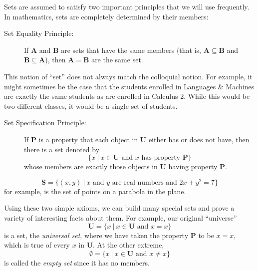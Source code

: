 \documentclass{article}
\newcommand\A{\mathbf A}
\newcommand\B{\mathbf B}
\newcommand\Pb{\mathbf P}
\newcommand\Sb{\mathbf S}
\newcommand\U{\mathbf U}
\newcommand{\0}{\mathbf 0}
\newcommand{\1}{\mathbf 1}
\begin{document}
Sets are assumed to satisfy two important principles that we will use frequently. In mathematics, sets are completely determined by their members:

\begin{description}
  \item[Set Equality Principle:] If $\A$ and $\B$ are sets that have the same members (that is, $\A \subseteq \B$ and $\B \subseteq \A$), then $\A = \B$ are the same set.
\end{description}

This notion of ``set'' does not always match the colloquial notion. For example, it might sometimes be the case that the students enrolled in Languages \& Machines are exactly the same students as are enrolled in Calculus 2. While this would be two different classes, it would be a single set of students.

\begin{description}
  \item[Set Specification Principle:] If $\Pb$ is a property that each object in $\U$ either has or does not have, then there is a set denoted by
    \begin{equation*}
    \{ x\ |\ x \in \U \text{ and } x \text{ has property } \Pb \}
    \end{equation*}
    whose members are exactly those objects in $\U$ having property $\Pb$.
\end{description}

\begin{equation*}
\Sb = \{ (x,y)\ |\ x \text{ and } y \text{ are real numbers and } 2x + y^2 = 7 \}
\end{equation*}
for example, is the set of points on a parabola in the plane.

Using these two simple axioms, we can build many special sets and prove a variety of interesting facts about them. For example, our original ``universe''
\begin{equation*}
\U = \{ x\ |\ x \in \U \text{ and } x = x \}
\end{equation*}
is a set, the \emph{universal set}, where we have taken the property $\Pb$ to be $x = x$, which is true of every $x$ in $\U$. At the other extreme,
\begin{equation*}
\emptyset = \{ x\ |\ x \in \U \text{ and } x \neq x \}
\end{equation*}
is called the \emph{empty set} since it has no members.
\end{document}
